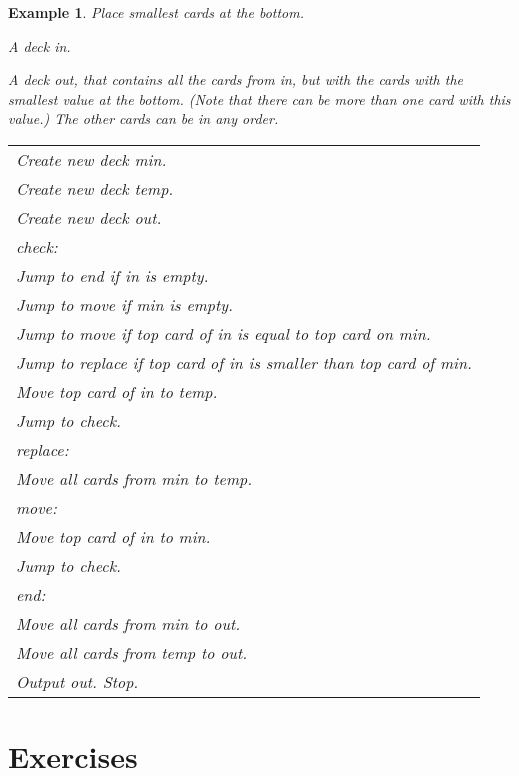 \documentclass[a4paper,twoside]{tufte-handout}
\newtheorem{example}{Example}
\newcommand\lbl[1]{\hspace{-1em}\emph{#1:}}
\begin{document}
\begin{example}\label{smallbottom}
  Place smallest cards at the bottom.
  \begin{description}
  \item[Input:] A deck \emph{in}.
  \item[Output:] A deck \emph{out}, that contains all the cards from
    in, but with the cards with the smallest value at the
    bottom. (Note that there can be more than one card with this
    value.) The other cards can be in any order.
 \item[Algorithm:]
  \item\normalfont
    \begin{tabular}{l}
      Create new deck \emph{min}.\\
      Create new deck \emph{temp}.\\
      Create new deck \emph{out}.\\
      \lbl{check}\\
      Jump to \emph{end} if \emph{in} is empty.\\
      Jump to \emph{move} if \emph{min} is empty.\\
      Jump to \emph{move} if top card of \emph{in} is equal to
      top card on \emph{min}.\\
      Jump to \emph{replace} if top card of \emph{in} is smaller than
      top card of \emph{min}.\\
      Move top card of \emph{in} to \emph{temp}.\\
      Jump to \emph{check}.\\
      \lbl{replace}\\
      Move all cards from \emph{min} to \emph{temp}.\\
      \lbl{move}\\
      Move top card of \emph{in} to \emph{min}.\\
      Jump to \emph{check}.\\
      \lbl{end}\\
      Move all cards from \emph{min} to \emph{out}.\\
      Move all cards from \emph{temp} to \emph{out}.\\
      Output \emph{out}.
      Stop.
    \end{tabular}
  \end{description}
\end{example}

\section{Exercises}\label{sec-exer}
\end{document}
